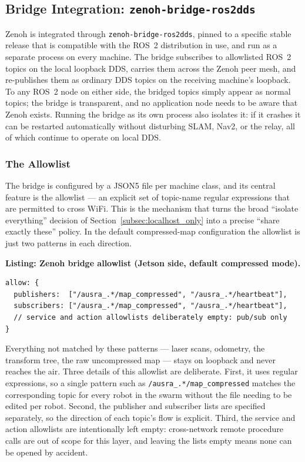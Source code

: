 \subsection{Bridge Integration: \texttt{zenoh-bridge-ros2dds}}
\label{subsec:bridge}

Zenoh is integrated through \texttt{zenoh-bridge-ros2dds}, pinned to a specific stable release that is compatible with the ROS~2 distribution in use, and run as a separate process on every machine. The bridge subscribes to allowlisted ROS~2 topics on the local loopback DDS, carries them across the Zenoh peer mesh, and re-publishes them as ordinary DDS topics on the receiving machine's loopback. To any ROS~2 node on either side, the bridged topics simply appear as normal topics; the bridge is transparent, and no application node needs to be aware that Zenoh exists. Running the bridge as its own process also isolates it: if it crashes it can be restarted automatically without disturbing SLAM, Nav2, or the relay, all of which continue to operate on local DDS.

\subsubsection{The Allowlist}
\label{subsubsec:allowlist}

The bridge is configured by a JSON5 file per machine class, and its central feature is the allowlist --- an explicit set of topic-name regular expressions that are permitted to cross WiFi. This is the mechanism that turns the broad ``isolate everything'' decision of Section~\ref{subsec:localhost_only} into a precise ``share exactly these'' policy. In the default compressed-map configuration the allowlist is just two patterns in each direction.

\noindent\textbf{Listing: Zenoh bridge allowlist (Jetson side, default compressed mode).}
\begin{lstlisting}
allow: {
  publishers:  ["/ausra_.*/map_compressed", "/ausra_.*/heartbeat"],
  subscribers: ["/ausra_.*/map_compressed", "/ausra_.*/heartbeat"],
  // service and action allowlists deliberately empty: pub/sub only
}
\end{lstlisting}

Everything not matched by these patterns --- laser scans, odometry, the transform tree, the raw uncompressed map --- stays on loopback and never reaches the air. Three details of this allowlist are deliberate. First, it uses regular expressions, so a single pattern such as \texttt{/ausra\_.*/map\_compressed} matches the corresponding topic for every robot in the swarm without the file needing to be edited per robot. Second, the publisher and subscriber lists are specified separately, so the direction of each topic's flow is explicit. Third, the service and action allowlists are intentionally left empty: cross-network remote procedure calls are out of scope for this layer, and leaving the lists empty means none can be opened by accident.

